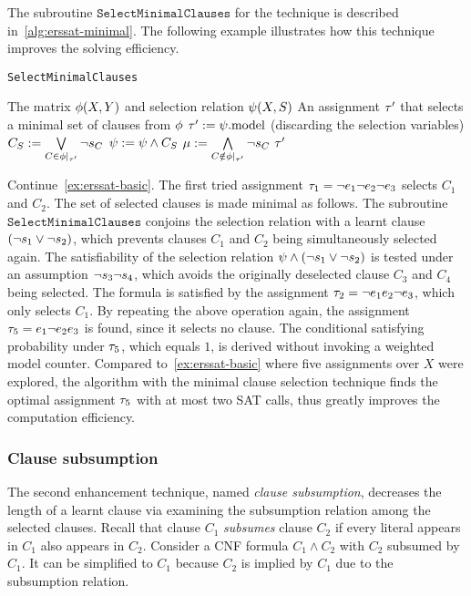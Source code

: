 The subroutine $\texttt{SelectMinimalClauses}$ for the technique is described in~\cref{alg:erssat-minimal}.
The following example illustrates how this technique improves the solving efficiency.

\begin{algorithm}[p]
    \caption{\texttt{SelectMinimalClauses}}
    \label{alg:erssat-minimal}
    \begin{algorithmic}[1]
        \REQUIRE The matrix $\phi(X,Y)$ and selection relation $\psi(X,S)$
        \ENSURE An assignment $\tau'$ that selects a minimal set of clauses from $\phi$
        \REPEAT
        \STATE $\tau' := \psi.\mathrm{model}$ (discarding the selection variables)
        \STATE $C_S := \bigvee\limits_{C\in\phi|_{\tau'}}\lnot s_{C}$
        \STATE $\psi := \psi \land C_S$
        \STATE $\mu := \bigwedge\limits_{C\notin\phi|_{\tau'}}\lnot s_{C}$
        \UNTIL{($\unsat{\pcf{\select}{\mu}}$)}
        \RETURN $\tau'$
    \end{algorithmic}
\end{algorithm}

\begin{example}
    \label{ex:erssat-minimal}
    Continue~\cref{ex:erssat-basic}.
    The first tried assignment $\tau_1=\lnot e_1 \lnot e_2 \lnot e_3$ selects $C_1$ and $C_2$.
    The set of selected clauses is made minimal as follows.
    The subroutine $\texttt{SelectMinimalClauses}$ conjoins the selection relation with a learnt clause $(\lnot s_{1} \lor \lnot s_{2})$,
    which prevents clauses $C_1$ and $C_2$ being simultaneously selected again.
    The satisfiability of the selection relation $\psi\land(\lnot s_{1} \lor \lnot s_{2})$ is tested under an assumption $\lnot s_{3} \lnot s_{4}$,
    which avoids the originally deselected clause $C_3$ and $C_4$ being selected.
    The formula is satisfied by the assignment $\tau_2=\lnot e_1 e_2 \lnot e_3$, which only selects $C_1$.
    By repeating the above operation again,
    the assignment $\tau_5=e_1 \lnot e_2 e_3$ is found,
    since it selects no clause.
    The conditional satisfying probability under $\tau_5$, which equals $1$,
    is derived without invoking a weighted model counter.
    Compared to~\ref{ex:erssat-basic} where five assignments over $X$ were explored,
    the algorithm with the minimal clause selection technique finds the optimal assignment $\tau_5$ with at most two SAT calls,
    thus greatly improves the computation efficiency.
\end{example}

\subsubsection{Clause subsumption}
The second enhancement technique, named \textit{clause subsumption},
decreases the length of a learnt clause via examining the subsumption relation among the selected clauses.
Recall that clause $C_1$ \textit{subsumes} clause $C_2$ if every literal appears in $C_1$ also appears in $C_2$.
Consider a CNF formula $C_1 \land C_2$ with $C_2$ subsumed by $C_1$.
It can be simplified to $C_1$ because $C_2$ is implied by $C_1$ due to the subsumption relation.

